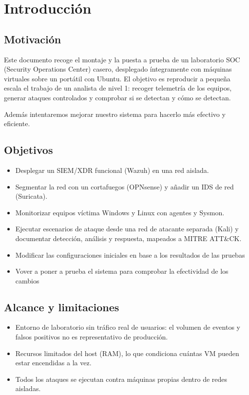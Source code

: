 \chapter{Introducción}\label{cap:introduccion}

\section{Motivación}
Este documento recoge el montaje y la puesta a prueba de un laboratorio SOC
(Security Operations Center) casero, desplegado íntegramente con
máquinas virtuales sobre un portátil con Ubuntu. El objetivo es reproducir a
pequeña escala el trabajo de un analista de nivel 1: recoger telemetría de los
equipos, generar ataques controlados y comprobar si se detectan y cómo se
detectan.

Además intentaremos mejorar nuestro sistema para hacerlo más efectivo y eficiente.

\section{Objetivos}
\begin{itemize}[leftmargin=*]
  \item Desplegar un SIEM/XDR funcional (Wazuh) en una red aislada.
  \item Segmentar la red con un cortafuegos (OPNsense) y añadir un IDS de red (Suricata).
  \item Monitorizar equipos víctima Windows y Linux con agentes y Sysmon.
  \item Ejecutar escenarios de ataque desde una red de atacante separada (Kali)
        y documentar detección, análisis y respuesta, mapeados a MITRE ATT\&CK.
  \item Modificar las configuraciones iniciales en base a los resultados de las pruebas
  \item Vover a poner a prueba el sistema para comprobar la efectividad de los cambios
\end{itemize}

\section{Alcance y limitaciones}
\begin{itemize}[leftmargin=*]
  \item Entorno de laboratorio sin tráfico real de usuarios: el volumen de
        eventos y falsos positivos no es representativo de producción.
  \item Recursos limitados del host (RAM), lo que condiciona cuántas VM pueden
        estar encendidas a la vez.
  \item Todos los ataques se ejecutan contra máquinas propias dentro de redes aisladas.
\end{itemize}

